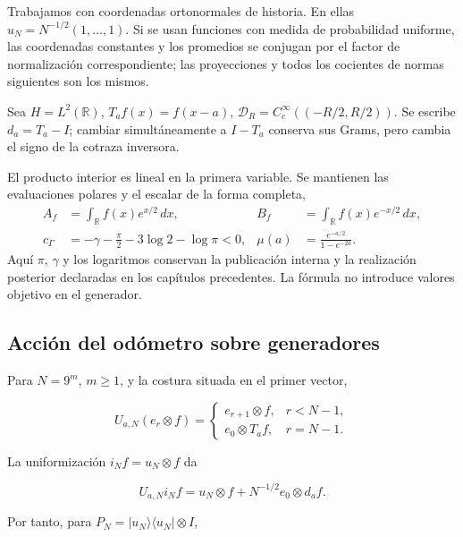 Trabajamos con coordenadas ortonormales de historia. En ellas \(u_N=N^{-1/2}(1,\ldots,1)\). Si se usan funciones con medida de probabilidad uniforme, las coordenadas constantes y los promedios se conjugan por el factor de normalización correspondiente; las proyecciones y todos los cocientes de normas siguientes son los mismos.

Sea \(H=L^2(\mathbb R)\), \(T_af(x)=f(x-a)\), \(\mathcal D_R=C_c^\infty((-R/2,R/2))\). Se escribe \(d_a=T_a-I\); cambiar simultáneamente a \(I-T_a\) conserva sus Grams, pero cambia el signo de la cotraza inversora.

El producto interior es lineal en la primera variable. Se mantienen las
evaluaciones polares y el escalar de la forma completa,
\begin{equation}
\begin{aligned}
A_f&=\int_{\mathbb R}f(x)e^{x/2}\,dx,
&B_f&=\int_{\mathbb R}f(x)e^{-x/2}\,dx,\\
c_\Gamma&=-\gamma-\frac\pi2-3\log2-\log\pi<0,
&\mu(a)&=\frac{e^{-a/2}}{1-e^{-2a}}.
\end{aligned}
\label{viii:gamma-add-def-evaluaciones}
\end{equation}
Aquí \(\pi\), \(\gamma\) y los logaritmos conservan la publicación
interna y la realización posterior declaradas en los capítulos precedentes.
La fórmula no introduce valores objetivo en el generador.

\subsection{Acción del odómetro sobre generadores}
\label{viii:gamma-add-sub-47}

Para \(N=9^m\), \(m\ge1\), y la costura situada en el primer vector,

\begin{equation}
U_{a,N}(e_r\otimes f)=
\begin{cases}
e_{r+1}\otimes f,&r<N-1,\\
e_0\otimes T_af,&r=N-1.
\end{cases}
\label{viii:gamma-add-display-1}
\end{equation}

La uniformización \(i_Nf=u_N\otimes f\) da

\begin{equation}
U_{a,N}i_Nf
=u_N\otimes f+N^{-1/2}e_0\otimes d_af.
\label{viii:gamma-add-display-2}
\end{equation}

Por tanto, para \(P_N=|u_N\rangle\langle u_N|\otimes I\),

